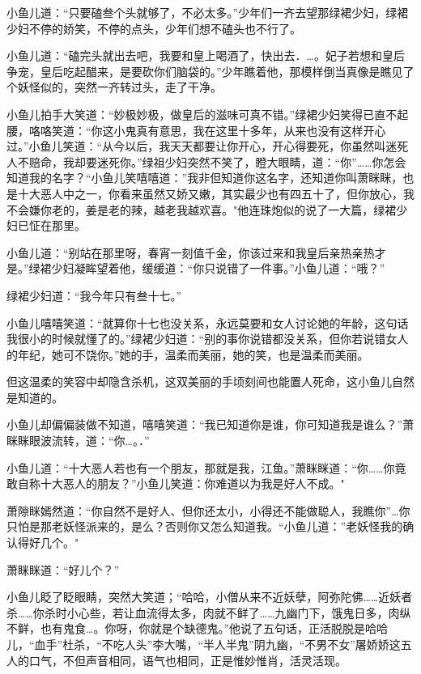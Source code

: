 \documentclass[12pt,oneside]{book}
\begin{document}
小鱼儿道：``只要磕叁个头就够了，不必太多。''少年们一齐去望那绿裙少妇，绿裙少妇不停的娇笑，不停的点头，少年们想不磕头也不行了。

小鱼儿道：``磕完头就出去吧，我要和皇上喝酒了，快出去．\ldots。妃子若想和皇后争宠，皇后吃起醋来，是要砍你们脑袋的。''少年瞧着他，那模样倒当真像是瞧见了个妖怪似的，突然一齐转过头，走了干净。

小鱼儿拍手大笑道：``妙极妙极，做皇后的滋味可真不错。''绿裙少妇笑得已直不起腰，咯咯笑道：``你这小鬼真有意思，我在这里十多年，从来也没有这样开心过。''小鱼儿笑道：``从今以后，我天天都要让你开心，开心得要死，你虽然叫迷死人不赔命，我却要迷死你。''绿祖少妇突然不笑了，瞪大眼睛，道：``你''\ldots\ldots 你怎会知道我的名字？``小鱼儿笑嘻嘻道：''我非但知道你这名字，还知道你叫萧眯眯，也是十大恶人中之一，你看来虽然又娇又嫩，其实最少也有四五十了，但你放心，我不会嫌你老的，姜是老的辣，越老我越欢喜。"他连珠炮似的说了一大篇，绿裙少妇已怔在那里。

小鱼儿道：``别站在那里呀，春宵一刻值千金，你该过来和我皇后亲热亲热才是。''绿裙少妇凝眸望着他，缓缓道：``你只说错了一件事。''小鱼儿道：``哦？''

绿裙少妇道：``我今年只有叁十七。''

小鱼儿嘻嘻笑道：``就算你十七也没关系，永远莫要和女人讨论她的年龄，这句话我很小的时候就懂了的。''绿裙少妇道：``别的事你说错都没关系，但你若说错女人的年纪，她可不饶你。''她的手，温柔而美丽，她的笑，也是温柔而美丽。

但这温柔的笑容中却隐含杀机，这双美丽的手顷刻间也能置人死命，这小鱼儿自然是知道的。

小鱼儿却偏偏装做不知道，嘻嘻笑道：``我已知道你是谁，你可知道我是谁么？''萧眯眯眼波流转，道：``你\ldots。．''

小鱼儿道：``十大恶人若也有一个朋友，那就是我，江鱼。''萧眯眯道：``你\ldots\ldots 你竟敢自称十大恶人的朋友？''小鱼儿笑道：你难道以为我是好人不成。"

萧隙眯嫣然道：``你自然不是好人、但你还太小，小得还不能做聪人，我瞧你''\ldots 你只怕是那老妖怪派来的，是么？否则你又怎么知道我。``小鱼儿道：''老妖怪我的确认得好几个。"

萧眯眯道：``好儿个？''

小鱼儿眨了眨眼睛，突然大笑道；``哈哈，小僧从来不近妖孽，阿弥陀佛\ldots\ldots 近妖者杀\ldots\ldots 你杀时小心些，若让血流得太多，肉就不鲜了\ldots\ldots 九幽门下，饿鬼日多，肉纵不鲜，也有鬼食\ldots。你呀，你就是个缺德鬼。''他说了五句话，正活脱脱是哈哈儿，``血手''杜杀，``不吃人头''李大嘴，``半人半鬼''阴九幽，``不男不女''屠娇娇这五人的口气，不但声音相同，语气也相同，正是惟妙惟肖，活灵活现。
\end{document}
